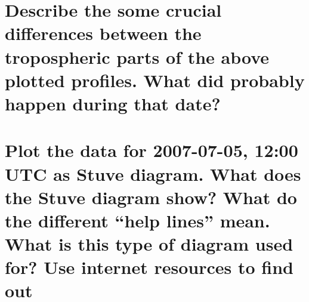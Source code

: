 \documentclass{article}
\begin{document}
\newpage
\section{Describe the some crucial differences between the tropospheric parts of the above plotted profiles. What did probably happen during that date?}



\newpage
\section{Plot the data for 2007-07-05, 12:00 UTC as Stuve diagram. What does the Stuve diagram show? What do the different “help lines” mean. What is this type of diagram used for? Use internet resources to find out}
\end{document}
